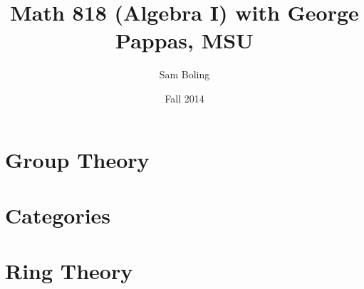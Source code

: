 \documentclass{report}
\title{Math 818 (Algebra I) with George Pappas, MSU}
\author{Sam Boling}
\date{Fall 2014}
\begin{document}
\maketitle

\chapter{Group Theory}








\chapter{Categories}


\chapter{Ring Theory}


\end{document}
